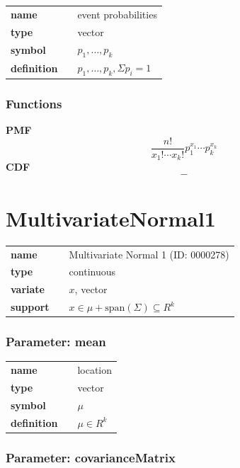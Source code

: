 \noindent\begin{tabular}{p{2cm}cl}
\textbf{name} & & event probabilities \\
\textbf{type} & & vector \\
\textbf{symbol} & & $p_1, \ldots, p_k$  \\
\textbf{definition} & & $p_1, \ldots, p_k, \Sigma p_i = 1$
\end{tabular}
\subsubsection*{Functions}

\smallskip \noindent \hspace{.2cm} \textbf{PMF} 
\begin{equation*}\frac{n!}{x_1!\cdots x_k!} p_1^{x_1} \cdots p_k^{x_k}\end{equation*}
\smallskip \noindent \hspace{.2cm} \textbf{CDF} 
\begin{equation*}-\end{equation*}
\smallskip\section*{MultivariateNormal1} 

  \bigskip 

\begin{tabular}{p{2cm}cl}
\textbf{name} & & Multivariate Normal 1 (ID: 0000278)\\ 
 
\textbf{type} & & continuous \\ 

\textbf{variate} & & $x$, vector \\ 

\textbf{support} & & $x \in \mu + \text{span}(\Sigma) \subseteq  R^k$
\end{tabular}
\subsubsection*{Parameter: mean}

\noindent\begin{tabular}{p{2cm}cl}
\textbf{name} & & location \\
\textbf{type} & & vector \\
\textbf{symbol} & & $\mu$  \\
\textbf{definition} & & $\mu \in R^k$
\end{tabular}
\subsubsection*{Parameter: covarianceMatrix}

